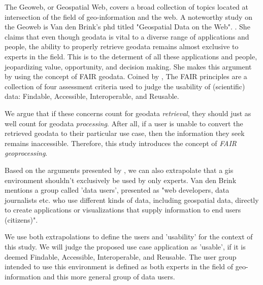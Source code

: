 The Geoweb, or Geospatial Web, covers a broad collection of topics located at intersection of the field of geo-information and the web. A noteworthy study on the Geoweb is Van den Brink's phd titled "Geospatial Data on the Web". \cite{brink_geospatial_2018}. She claims that even though geodata is vital to a diverse range of applications and people, the ability to properly retrieve geodata remains almost exclusive to experts in the field. This is to the determent of all these applications and people, jeopardizing value, opportunity, and decision making. She makes this argument by using the concept of FAIR geodata. Coined by \cite{mark_d_wilkinson_fair_2016}, The FAIR principles are a collection of four assessment criteria used to judge the usability of (scientific) data: Findable, Accessible, Interoperable, and Reusable. 

We argue that if these concerns count for geodata \textit{retrieval}, they should just as well count for geodata \textit{processing}. After all, if a user is unable to convert the retrieved geodata to their particular use case, then the information they seek remains inaccessible. Therefore, this study introduces the concept of \emph{FAIR geoprocessing}. 

Based on the arguments presented by \cite{brink_geospatial_2018}, we can also extrapolate that a \ac{gis} environment shouldn't exclusively be used by only experts. Van den Brink mentions a group called 'data users', presented as "web developers, data journalists etc. who use different kinds of data, including geospatial data, directly to create applications or visualizations that supply information to end users (citizens)". 

We use both extrapolations to define the users and 'usability' for the context of this study. We will judge the proposed use case application as 'usable', if it is deemed Findable, Accessible, Interoperable, and Reusable. The user group intended to use this environment is defined as both experts in the field of geo-information and this more general group of data users.


